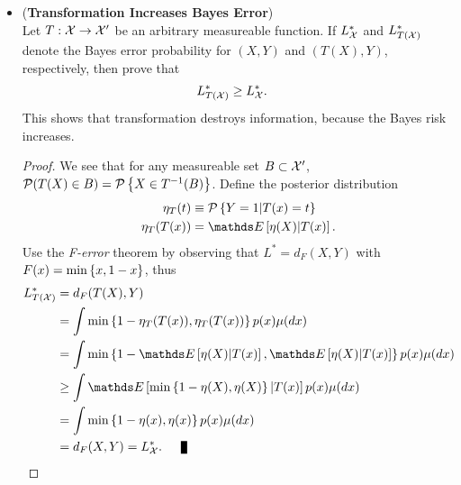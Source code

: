 \documentclass[11pt]{article}
\begin{document}
\begin{itemize}
\item \begin{exercise} (\textbf{Transformation Increases Bayes Error}) \citep{devroye2013probabilistic}\\
Let $T: {\mathcal X}\rightarrow {\mathcal X}' $ be an arbitrary measureable function. If $L_{{\mathcal X}}^{*}$ and $L_{T({\mathcal X})}^{*}$ denote the Bayes error probability for $(X,Y)$ and $(T(X), Y)$, respectively, then prove that 
\begin{align*}
L_{T({\mathcal X})}^{*} &\ge L_{{\mathcal X}}^{*}.
\end{align*}
This shows that transformation destroys information, because the Bayes risk increases. 
\end{exercise}
\begin{proof}
We see that for any measureable set $B\subset {\mathcal X}'$,  ${\mathcal P}(T(X)\in B) = {\mathcal P}\left\{X\in T^{-1}(B)\right\}$. Define the posterior distribution 
\begin{align*}
\eta_{T}(t) &\equiv \cP\set{Y=1| T(x)= t}\\
\eta_{T}(T(x)) &= \E{}{\eta(X)| T(x)}.\\
\end{align*} 
Use the \emph{F-error} theorem by observing that $L^{*} = d_{F}(X,Y)$ with $F(x) = \min\left\{x, 1-x\right\}$, thus
\begin{align*}
L_{T(\cX)}^{*}&=  d_{F}(T(X),Y)\\
&= \int \min\set{1- \eta_{T}(T(x)),  \eta_{T}(T(x))}p(x)\mu(dx)\\
&=  \int \min\set{1- \E{}{\eta(X)| T(x)},  \E{}{\eta(X)| T(x)}}p(x)\mu(dx)\\
&\ge \int \E{}{ \min\set{1- \eta(X), \eta(X)}  | T(x)} p(x)\mu(dx)\\
&= \int \min\set{1- \eta(x), \eta(x)}p(x)\mu(dx)\\
& = d_{F}(X,Y)=  L_{\cX}^{*}.\qed \\
\end{align*} 
\end{proof}


\end{itemize}
\end{document}
